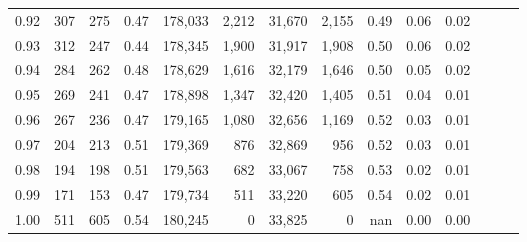 \begin{tabular}{rrrrrrrrrrrrrr}
0.92 &    307 &  275 &  0.47 &  178,033 &    2,212 &  31,670 &   2,155 &  0.49 &  0.06 &      0.02 \\
0.93 &    312 &  247 &  0.44 &  178,345 &    1,900 &  31,917 &   1,908 &  0.50 &  0.06 &      0.02 \\
0.94 &    284 &  262 &  0.48 &  178,629 &    1,616 &  32,179 &   1,646 &  0.50 &  0.05 &      0.02 \\
0.95 &    269 &  241 &  0.47 &  178,898 &    1,347 &  32,420 &   1,405 &  0.51 &  0.04 &      0.01 \\
0.96 &    267 &  236 &  0.47 &  179,165 &    1,080 &  32,656 &   1,169 &  0.52 &  0.03 &      0.01 \\
0.97 &    204 &  213 &  0.51 &  179,369 &      876 &  32,869 &     956 &  0.52 &  0.03 &      0.01 \\
0.98 &    194 &  198 &  0.51 &  179,563 &      682 &  33,067 &     758 &  0.53 &  0.02 &      0.01 \\
0.99 &    171 &  153 &  0.47 &  179,734 &      511 &  33,220 &     605 &  0.54 &  0.02 &      0.01 \\
1.00 &    511 &  605 &  0.54 &  180,245 &        0 &  33,825 &       0 &   nan &  0.00 &      0.00 \\
\bottomrule
\end{tabular}
